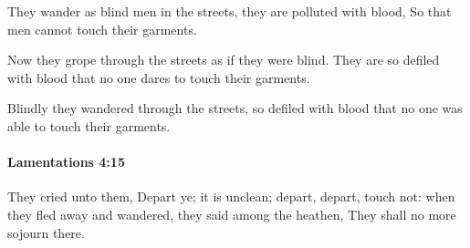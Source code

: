 			\begin{versebox}
					\item[BHS] 
					\item[LXX] 
					\item[ASV] They wander as blind men in the streets, they are polluted with blood, So that men cannot touch their garments.
					\item[NIV] Now they grope through the streets as if they were blind. They are so defiled with blood that no one dares to touch their garments.
					\item[NRSV] Blindly they wandered through the streets, so defiled with blood that no one was able to touch their garments.
			\end{versebox}

		\paragraph{Lamentations 4:15} %
			\label{LAMENTATIONS-4-15}

			They cried unto them, Depart ye; it is unclean; depart, depart, touch not: when they fled away and wandered, they said among the heathen, They shall no more sojourn there.

